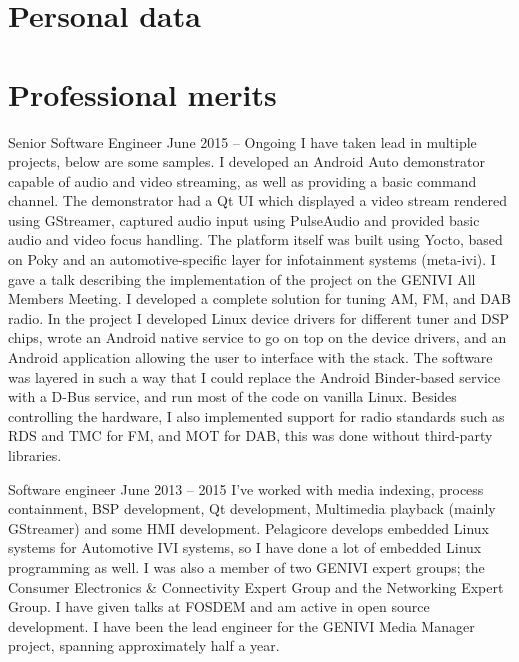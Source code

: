 \documentclass{twocolcv}
\begin{document}
\section*{Personal data}
\section*{Professional merits}
           {Senior Software Engineer}
           {June 2015 -- Ongoing}
           {
I have taken lead in multiple projects, below are some samples.\newline\newline
{}
        {I developed an Android Auto demonstrator capable of audio and video streaming, as well as providing a basic command channel. The demonstrator had a Qt UI which displayed a video stream rendered using GStreamer, captured audio input using PulseAudio and provided basic audio and video focus handling. The platform itself was built using Yocto, based on Poky and an automotive-specific layer for infotainment systems (meta-ivi). I gave a talk describing the implementation of the project on the GENIVI All Members Meeting.}
\newline\newline
{}
        {I developed a complete solution for tuning AM, FM, and DAB radio. In the project I developed Linux device drivers for different tuner and DSP chips, wrote an Android native service to go on top on the device drivers, and an Android application allowing the user to interface with the stack. The software was layered in such a way that I could replace the Android Binder-based service with a D-Bus service, and run most of the code on vanilla Linux. Besides controlling the hardware, I also implemented support for radio standards such as RDS and TMC for FM, and MOT for DAB, this was done without third-party libraries.}
}

     {Software engineer}
     {June 2013 -- 2015}
     {I've worked with media indexing, process containment, BSP development, Qt development, Multimedia playback (mainly GStreamer) and some HMI development. Pelagicore develops embedded Linux systems for Automotive IVI systems, so I have done a lot of embedded Linux programming as well. I was also a member of two GENIVI expert groups; the Consumer Electronics \& Connectivity Expert Group and the Networking Expert Group. I have given talks at FOSDEM and am active in open source development. I have been the lead engineer for the GENIVI Media Manager project, spanning approximately half a year.}
\end{document}
